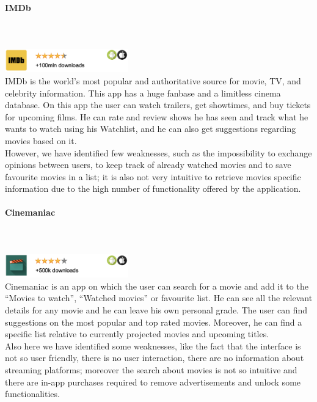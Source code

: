 \documentclass[12pt, a4paper]{article}
\begin{document}
\paragraph{IMDb}\mbox{}\\\\
\includegraphics[width=0.4\textwidth]{Images/IMDb.png}\\
IMDb is the world's most popular and authoritative source for movie, TV, and celebrity information. This app has a 
huge fanbase and a limitless cinema database.
On this app the user can watch trailers, get showtimes, and buy tickets for upcoming films. He can rate and review shows he has seen 
and track what he wants to watch using his Watchlist, and he can also get suggestions regarding movies based on it.\\
However, we have identified few weaknesses, such as the impossibility to exchange opinions between users, to keep track
of already watched movies and to save favourite movies in a list; it is also not very intuitive to retrieve movies specific
information due to the high number of functionality offered by the application.

\paragraph{Cinemaniac}\mbox{}\\\\
\includegraphics[width=0.4\textwidth]{Images/Cinemaniac.png}\\
Cinemaniac is an app on which the user can search for a movie and add it to the “Movies to watch”, “Watched movies” or favourite list.
He can see all the relevant details for any movie and he can leave his own personal grade.
The user can find suggestions on the most popular and top rated movies. 
Moreover, he can find a specific list relative to currently projected movies and upcoming titles.\\
Also here we have identified some weaknesses, like the fact that the interface is not so user friendly, there is no user interaction,
there are no information about streaming platforms; moreover the search about movies is not so intuitive and there are 
in-app purchases required to remove advertisements and unlock some functionalities.\\
\end{document}
